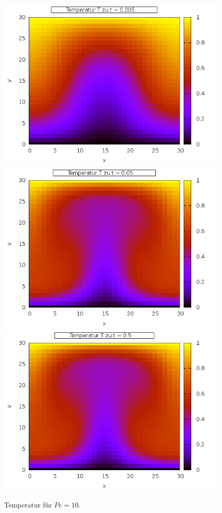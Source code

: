 \documentclass[12pt,a4paper,titlepage,headinclude,bibtotoc]{scrartcl}
\begin{document}
\hfill%
\noindent\begin{minipage}[t]{0.50\textwidth}%
\begin{figure}[H]  
   \includegraphics[width=\linewidth]{res/task4/10_0005.png}
   \includegraphics[width=\linewidth]{res/task4/10_005.png}
   \includegraphics[width=\linewidth]{res/task4/10_05.png}
   \caption{Temperatur für $Pe = 10$.}
   \label{fig:task4_10}
   \end{figure}
\end{minipage}%
\end{document}

